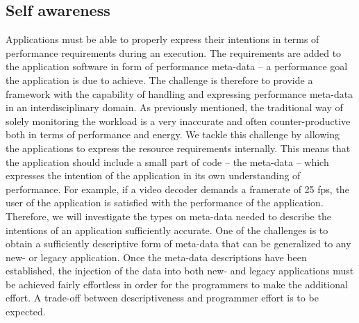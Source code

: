 \documentclass{article}
\begin{document}
\subsection{Self awareness}
\label{sec:self}
Applications must be able to properly express their intentions in terms of performance requirements during an execution. 
The requirements are added to the application software in form of performance meta-data -- a performance goal the application is due to achieve. 
The challenge is therefore to provide a framework with the capability of handling and expressing performance meta-data in an interdisciplinary domain.
As previously mentioned, the traditional way of solely monitoring the workload is a very inaccurate and often counter-productive both in terms of performance and energy.
We tackle this challenge by allowing the applications to express the resource requirements internally.
This means that the application should include a small part of code -- the meta-data -- which expresses the intention of the application in its own understanding of performance.
For example, if a video decoder demands a framerate of 25 fps, the user of the application is satisfied with the performance of the application.
Therefore, we will investigate the types on meta-data needed to describe the intentions of an application sufficiently accurate.
One of the challenges is to obtain a sufficiently descriptive form of meta-data that can be generalized to any new- or legacy application.
Once the meta-data descriptions have been established, the injection of the data into both new- and legacy applications must be achieved fairly effortless in order for the programmers to make the additional effort.
A trade-off between descriptiveness and programmer effort is to be expected.
\end{document}
